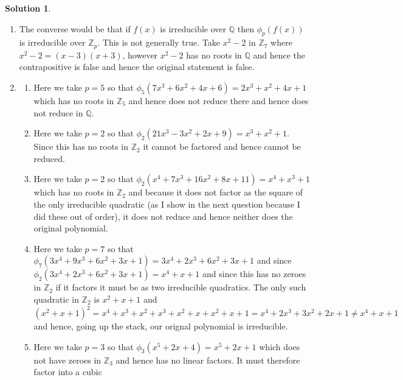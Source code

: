 \documentclass[10pt]{article}
\theoremstyle{definition}
\newtheorem{soln}{Solution}
\begin{document}
\begin{soln}
\begin{enumerate}[label=(\alph*)]
          if $f (x)$ is reducible over $\mathbb{Q}$, then it is reducible over $\mathbb{Z}$. Taking the contrapositive of this we obtain that
          if $f (x)$ is irreducible over $\mathbb{Z}$, then it is irreducible over $\mathbb{Q}$, and we have proved here that $\phi_p(f(x))$ being irreducible over $\mathbb{Z}_p$
          implies that $f(x)$ is irreducible over $\mathbb{Z}$ and hence by the contrapositive of the theorem, it is irreducible over $\mathbb{Q}$.
    \item The converse would be that if $f(x)$ is irreducible over $\mathbb{Q}$ then $\phi_p(f(x))$ is irreducible over $\mathbb{Z}_p$. This is not generally true. Take
          $x^2-2$ in $\mathbb{Z}_7$ where $x^2-2=(x-3)(x+3)$, however $x^2-2$ has no roots in $\mathbb{Q}$ and hence the contrapositive is false and hence the original statement is false.
    \item \begin{enumerate}[label=(\roman*)]
            \item Here we take $p=5$ so that $\phi_5(7x^3 + 6x^2 + 4x + 6)=2x^3 + x^2 + 4x + 1$ which has no roots in $\mathbb{Z}_5$ and hence does not reduce there and hence does not reduce in $\mathbb{Q}$.
            \item Here we take $p=2$ so that $\phi_2(21x^3 - 3x^2 + 2x + 9)=x^3 + x^2 + 1$. Since this has no roots in $\mathbb{Z}_2$ it cannot be factored and hence cannot be reduced.
            \item Here we take $p=2$ so that $\phi_2(x^4 + 7x^3 + 16x^2 + 8x + 11)=x^4 + x^3 + 1$ which has no roots in $\mathbb{Z}_2$ and because it does not factor as the square of the only irreducible quadratic
                  (as I show in the next question because I did these out of order), it does not reduce and hence neither does the original polynomial.
            \item Here we take $p=7$ so that $\phi_7(3x^4 + 9x^3 + 6x^2 + 3x + 1)=3x^4 + 2x^3 + 6x^2 + 3x + 1$ and since $\phi_2(3x^4 + 2x^3 + 6x^2 + 3x + 1)=x^4 + x + 1$ and since this has no zeroes
                  in $\mathbb{Z}_2$ if it factors it must be as two irreducible quadratics. The only such quadratic in $\mathbb{Z}_2$ is $x^2+x+1$ and
                  $(x^2+x+1)^2= x^4+x^3+x^2+x^3+x^2+x+x^2+x+1=x^4+2x^3+3x^2+2x+1\neq x^4 + x + 1$ and hence, going up the stack, our orignal polynomial is irreducible.
            \item Here we take $p=3$ so that $\phi_3(x^5 + 2x + 4)=x^5+2x+1$ which does not have zeroes in $\mathbb{Z}_3$ and hence has no linear factors. It must therefore factor into a cubic

\end{enumerate}
\end{enumerate}
\end{soln}
\end{document}

